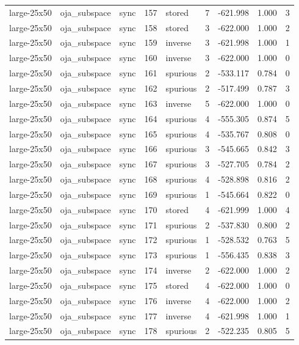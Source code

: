 \begin{tabular}{lllrlrrrr}
large-25x50 & oja\_subspace & sync & 157 & stored & 7 & -621.998 & 1.000 & 3 \\
large-25x50 & oja\_subspace & sync & 158 & stored & 3 & -622.000 & 1.000 & 2 \\
large-25x50 & oja\_subspace & sync & 159 & inverse & 3 & -621.998 & 1.000 & 1 \\
large-25x50 & oja\_subspace & sync & 160 & inverse & 3 & -622.000 & 1.000 & 0 \\
large-25x50 & oja\_subspace & sync & 161 & spurious & 2 & -533.117 & 0.784 & 0 \\
large-25x50 & oja\_subspace & sync & 162 & spurious & 2 & -517.499 & 0.787 & 3 \\
large-25x50 & oja\_subspace & sync & 163 & inverse & 5 & -622.000 & 1.000 & 0 \\
large-25x50 & oja\_subspace & sync & 164 & spurious & 4 & -555.305 & 0.874 & 5 \\
large-25x50 & oja\_subspace & sync & 165 & spurious & 4 & -535.767 & 0.808 & 0 \\
large-25x50 & oja\_subspace & sync & 166 & spurious & 3 & -545.665 & 0.842 & 3 \\
large-25x50 & oja\_subspace & sync & 167 & spurious & 3 & -527.705 & 0.784 & 2 \\
large-25x50 & oja\_subspace & sync & 168 & spurious & 4 & -528.898 & 0.816 & 2 \\
large-25x50 & oja\_subspace & sync & 169 & spurious & 1 & -545.664 & 0.822 & 0 \\
large-25x50 & oja\_subspace & sync & 170 & stored & 4 & -621.999 & 1.000 & 4 \\
large-25x50 & oja\_subspace & sync & 171 & spurious & 2 & -537.830 & 0.800 & 2 \\
large-25x50 & oja\_subspace & sync & 172 & spurious & 1 & -528.532 & 0.763 & 5 \\
large-25x50 & oja\_subspace & sync & 173 & spurious & 1 & -556.435 & 0.838 & 3 \\
large-25x50 & oja\_subspace & sync & 174 & inverse & 2 & -622.000 & 1.000 & 2 \\
large-25x50 & oja\_subspace & sync & 175 & stored & 4 & -622.000 & 1.000 & 0 \\
large-25x50 & oja\_subspace & sync & 176 & inverse & 4 & -622.000 & 1.000 & 2 \\
large-25x50 & oja\_subspace & sync & 177 & inverse & 4 & -621.998 & 1.000 & 1 \\
large-25x50 & oja\_subspace & sync & 178 & spurious & 2 & -522.235 & 0.805 & 5 \\

\end{tabular}
